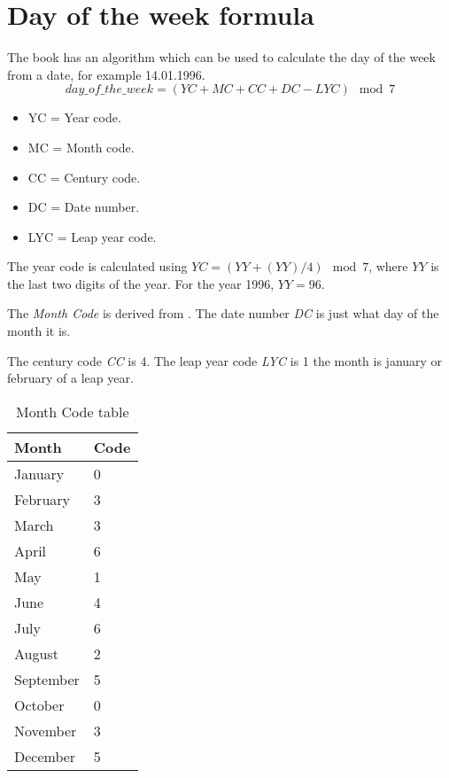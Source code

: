 \section{Day of the week formula}
\label{section:BT:day-of-the-week-formula}
The book \cite{Hale-Evans2006} has an algorithm which can be used to calculate
the day of the week from a date, for example 14.01.1996.
\begin{equation}
  day\_of\_the\_week
  = (YC + MC + CC + DC - LYC) \mod{7}
  \label{eq:day_of_the_week}
\end{equation}

\begin{itemize}
  \item YC = Year code.
  \item MC = Month code.
  \item CC = Century code.
  \item DC = Date number.
  \item LYC = Leap year code.
\end{itemize}

The year code is calculated using
$YC = (YY + (YY)/4) \mod{7}$, where $YY$ is the last
two digits of the year. For the year 1996, $YY = 96$.

The \textit{Month Code} is derived from .
The date number \textit{DC} is just what day of the month it is.

The century code \textit{CC} is 4. The leap year code \textit{LYC} is 1 the
month is january or february of a leap year.

\begin{table}[h]
  \centering
  \caption{Month Code table}
  \label{table:month_codes}
  \begin{tabular}{|l|l|}\hline
    Month     & Code \\ \hline
    January   & 0    \\
    February  & 3    \\
    March     & 3    \\
    April     & 6    \\
    May       & 1    \\
    June      & 4    \\
    July      & 6    \\
    August    & 2    \\
    September & 5    \\
    October   & 0    \\
    November  & 3    \\
    December  & 5    \\
    \hline
  \end{tabular}
\end{table}
